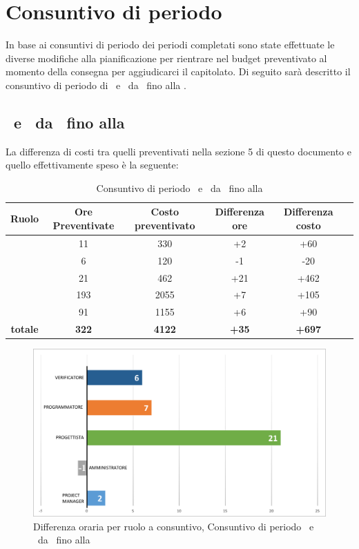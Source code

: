 \newpage
\section{Consuntivo di periodo}

In base ai consuntivi di periodo dei periodi completati sono state effettuate le diverse modifiche alla pianificazione per rientrare nel budget preventivato al momento della consegna per aggiudicarci il capitolato.
Di seguito sarà descritto il consuntivo di periodo di \PD\ e \COD\ da \RP\ fino alla \RQ.

\subsection{\PD\ e \COD\ da \RP\ fino alla \RQ}
La differenza di costi tra quelli preventivati nella sezione 5 di questo documento e quello effettivamente speso è la seguente:

\begin{table}[h]
	\begin{center}
		\begin{tabular}{|c|c|c|c|c|c|}
			\hline
			\textbf{Ruolo}	& \textbf{Ore Preventivate} & \textbf{Costo preventivato} &  \textbf{Differenza ore} & \textbf{Differenza costo} \\
			\hline
			\Pm &	11 & 330 & +2 & +60\\
			\hline
			\Am	&	6 & 120 & -1 & -20\\
			\hline
			\Prog	&	21 & 462 & +21 & +462\\
			\hline
			\Progr	&	193 & 2055 & +7 & +105\\
			\hline
			\Ver	&	91 & 1155 & +6 & +90\\
			\hline
			\textbf{totale}	&	\textbf{322} & \textbf{4122} & \textbf{+35} & \textbf{+697}\\
			\hline
		\end{tabular}
	\end{center}
	\caption{Consuntivo di periodo \PD\ e \COD\ da \RP\ fino alla \RQ}
\end{table}

\begin{figure}[H]
	\centering
	\includegraphics[scale=0.7]{Immagini/GraficiCONS/DIFFCONS.png}
	\caption{Differenza oraria per ruolo a consuntivo, Consuntivo di periodo \PD\ e \COD\ da \RP\ fino alla \RQ}
\end{figure}

